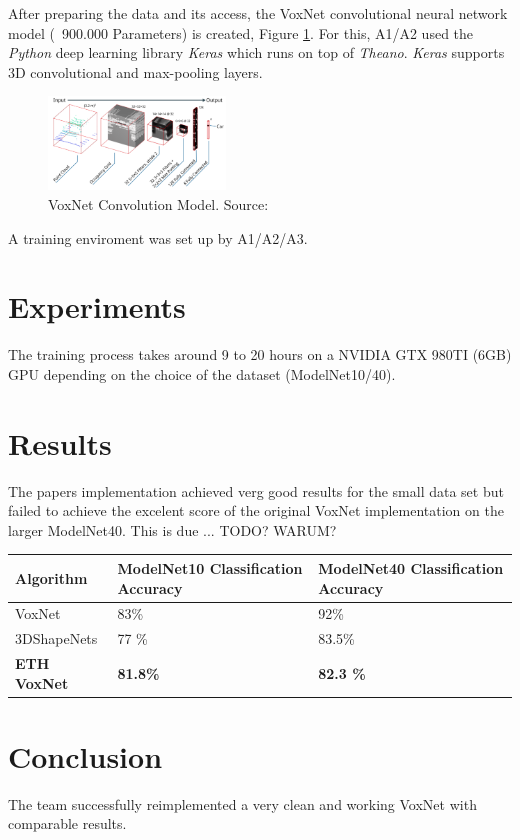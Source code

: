 \documentclass[10pt,twocolumn,letterpaper]{article}
\begin{document}
After preparing the data and its access, the VoxNet convolutional neural network model (~900.000 Parameters) is created, Figure \ref{fig:model}. For this, A1/A2 used the \textit{Python} deep learning library \textit{Keras} which runs on top of \textit{Theano}. \textit{Keras} supports 3D convolutional and max-pooling layers. 

\begin{figure}[h]
	\label{fig:model}
	\centering
	\includegraphics[width=0.42\textwidth]{model}
	\caption{VoxNet Convolution Model. Source: \cite{mature}}
\end{figure}

A training enviroment was set up by A1/A2/A3.

\section{Experiments}

The training process takes around 9 to 20 hours on a NVIDIA GTX 980TI (6GB) GPU depending on the choice of the dataset (ModelNet10/40).

\section{Results}

The papers implementation achieved verg good results for the small data set but failed to achieve the excelent score of the 
original VoxNet implementation on the larger ModelNet40. 
This is due ... TODO? WARUM? \\ 

\begin{tabular}{ |p{2.5cm}||p{2.5cm}|p{2.5cm}|  }
 \hline
 Algorithm & ModelNet10 Classification Accuracy  & ModelNet40 Classification Accuracy \\
 \hline
 VoxNet \cite{maturana_iros_2015}   & 83\% & 92\% \\
 3DShapeNets  \cite{shape}   & 77 \% & 83.5\% \\
\textbf{ETH VoxNet}    & \textbf{81.8\%}   & \textbf{82.3 \%}  \\
 \hline
\end{tabular}

\section{Conclusion}

The team successfully reimplemented a very clean and working VoxNet with comparable results.

{\small


}
\end{document}
